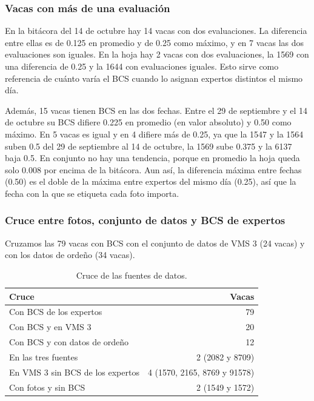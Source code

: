 \subsubsection*{Vacas con más de una evaluación}

En la bitácora del 14 de octubre hay 14 vacas con dos evaluaciones. La diferencia entre ellas es de 0.125 en promedio y de 0.25 como máximo, y en 7 vacas las dos evaluaciones son iguales. En la hoja hay 2 vacas con dos evaluaciones, la 1569 con una diferencia de 0.25 y la 1644 con evaluaciones iguales. Esto sirve como referencia de cuánto varía el BCS cuando lo asignan expertos distintos el mismo día.

Además, 15 vacas tienen BCS en las dos fechas. Entre el 29 de septiembre y el 14 de octubre su BCS difiere 0.225 en promedio (en valor absoluto) y 0.50 como máximo. En 5 vacas es igual y en 4 difiere más de 0.25, ya que la 1547 y la 1564 suben 0.5 del 29 de septiembre al 14 de octubre, la 1569 sube 0.375 y la 6137 baja 0.5. En conjunto no hay una tendencia, porque en promedio la hoja queda solo 0.008 por encima de la bitácora. Aun así, la diferencia máxima entre fechas (0.50) es el doble de la máxima entre expertos del mismo día (0.25), así que la fecha con la que se etiqueta cada foto importa.

\subsubsection*{Cruce entre fotos, conjunto de datos y BCS de expertos}

Cruzamos las 79 vacas con BCS con el conjunto de datos de VMS 3 (24 vacas) y con los datos de ordeño (34 vacas).

\begin{table}[H]
  \centering
  \caption{Cruce de las fuentes de datos.}
  \label{tab:cruce}
  \begin{tabular}{lr}
    \toprule
    Cruce & Vacas \\
    \midrule
    Con BCS de los expertos & 79 \\
    Con BCS y en VMS 3 & 20 \\
    Con BCS y con datos de ordeño & 12 \\
    En las tres fuentes & 2 (2082 y 8709) \\
    En VMS 3 sin BCS de los expertos & 4 (1570, 2165, 8769 y 91578) \\
    Con fotos y sin BCS & 2 (1549 y 1572) \\
    \bottomrule
  \end{tabular}
\end{table}

